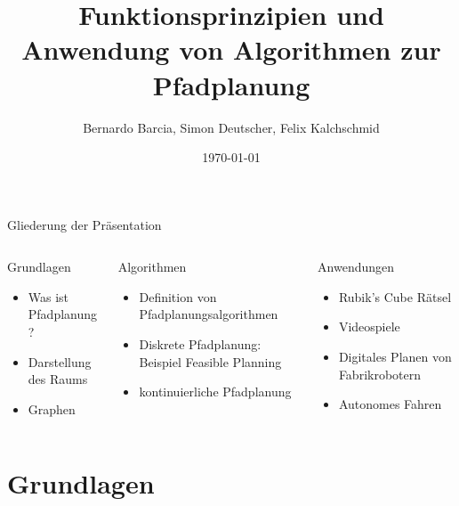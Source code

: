 \documentclass[t,aspectratio=169,dvipsnames]{beamer}
\title{Funktionsprinzipien und Anwendung von Algorithmen zur Pfadplanung}
\author{Bernardo Barcia, Simon Deutscher, Felix Kalchschmid}							%
\institute{Hochschule Trier}
\date{\today}
\begin{document}
\begin{frame}
	\titlepage
\end{frame}
\begin{frame}{Gliederung der Präsentation}
	\begin{columns}[T]
		\begin{column}[T]{0.33\textwidth}
			\begin{block}{Grundlagen}
				\begin{itemize}
					\item Was ist Pfadplanung?
					\item Darstellung des Raums
					\item Graphen
					\newline\newline\newline
				\end{itemize}
			\end{block}
		\end{column}
		\begin{column}[T]{0.33\textwidth}
			\begin{block}{Algorithmen}
				\begin{itemize}\color{lightgray}
					\item Definition von Pfadplanungsalgorithmen
					\item Diskrete Pfadplanung: Beispiel Feasible Planning
					\item kontinuierliche Pfadplanung
				\end{itemize}
			\end{block}
		\end{column}
		\begin{column}[T]{0.33\textwidth}
			\begin{block}{Anwendungen}
				\begin{itemize}\color{lightgray}
					\item Rubik's Cube Rätsel
					\item Videospiele
					\item Digitales Planen von Fabrikrobotern
					\item Autonomes Fahren
					\newline\newline
				\end{itemize}		
			\end{block}
		\end{column}
	\end{columns}	
\end{frame}

\section{Grundlagen}
\end{document}
